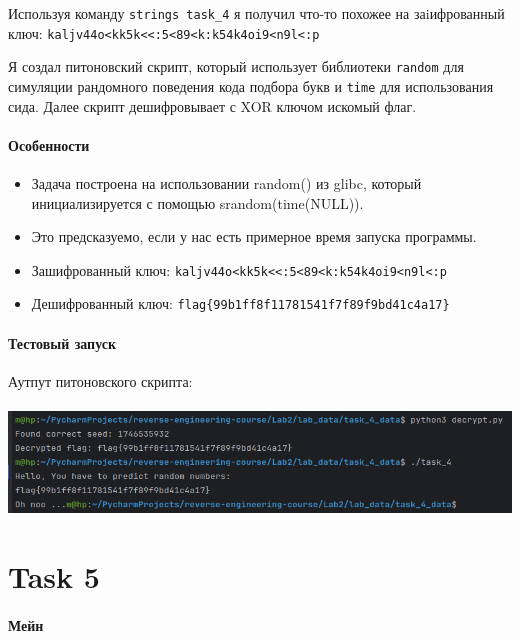     Используя команду \texttt{strings task\_4} я получил что-то похожее на заiифрованный ключ: \texttt{kaljv44o<kk5k<<:5<89<k:k54k4oi9<n9l<:p}

    Я создал питоновский скрипт, который использует библиотеки \texttt{random} для симуляции рандомного поведения кода
    подбора букв и \texttt{time} для использования сида. Далее скрипт дешифровывает с XOR ключом искомый флаг.

    \paragraph{Особенности}
    \begin{itemize}
        \item Задача построена на использовании random() из glibc, который инициализируется с помощью srandom(time(NULL)).
        \item Это предсказуемо, если у нас есть примерное время запуска программы.
        \item Зашифрованный ключ: \texttt{kaljv44o<kk5k<<:5<89<k:k54k4oi9<n9l<:p}
        \item Дешифрованный ключ: \texttt{flag\{99b1ff8f11781541f7f89f9bd41c4a17\}}
    \end{itemize}

    \paragraph{Тестовый запуск}
    Аутпут питоновского скрипта:

    \paragraph{}
    \includegraphics[width=1\linewidth]{static/solution_task_4.png}


    \section*{Task 5}

    \paragraph{Мейн}


